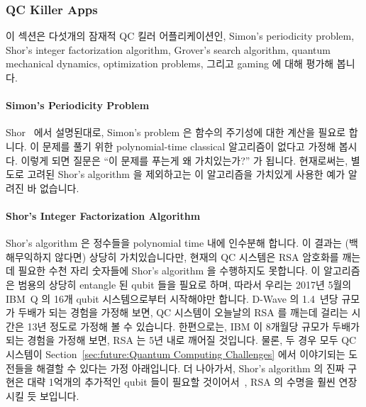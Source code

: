 \subsubsection{QC Killer Apps}
\label{sec:future:QC Killer Apps}

이 섹션은 다섯개의 잠재적 QC 킬러 어플리케이션인,
Simon's periodicity problem,
Shor's integer factorization algorithm,
Grover's search algorithm,
quantum mechanical dynamics,
optimization problems, 그리고
gaming 에 대해 평가해 봅니다.

\paragraph{Simon's Periodicity Problem}
\label{sec:future:Simon's Periodicity Problem}

Shor~\cite{PeterWSchor2001QuantumAlgorithms} 에서 설명된대로, Simon's problem
은 함수의 주기성에 대한 계산을 필요로 합니다.
이 문제를 풀기 위한 polynomial-time classical 알고리즘이 없다고 가정해 봅시다.
이렇게 되면 질문은 ``이 문제를 푸는게 왜 가치있는가?'' 가 됩니다.
현재로써는, 별도로 고려된 Shor's algorithm 을 제외하고는 이 알고리즘을 가치있게
사용한 예가 알려진 바 없습니다.

\paragraph{Shor's Integer Factorization Algorithm}
\label{sec:future:Shor's Integer Factorization Algorithm}

Shor's algorithm 은 정수들을 polynomial time 내에 인수분해 합니다.
이 결과는 (백해무익하지 않다면) 상당히 가치있습니다만, 현재의 QC 시스템은 RSA
암호화를 깨는데 필요한 수천 자리 숫자들에 Shor's algorithm 을 수행하지도
못합니다.
이 알고리즘은 범용의 상당히 entangle 된 qubit 들을 필요로 하며, 따라서 우리는
2017년 5월의 IBM~Q 의 16개 qubit 시스템으로부터 시작해야만 합니다.
D-Wave 의 1.4~년당 규모가 두배가 되는 경험을 가정해 보면, QC 시스템이 오늘날의
RSA 를 깨는데 걸리는 시간은 13년 정도로 가정해 볼 수 있습니다.
한편으로는, IBM 이 8개월당 규모가 두배가 되는 경험을 가정해 보면, RSA 는 5년
내로 깨어질 것입니다.
물론, 두 경우 모두 QC 시스템이
Section~\ref{sec:future:Quantum Computing Challenges} 에서 이야기되는 도전들을
해결할 수 있다는 가정 아래입니다.
더 나아가서, Shor's algorithm 의 진짜 구현은 대략 1억개의 추가적인 qubit 들이
필요할 것이어서~\cite{RachelCourtland2017GoogleQC}, RSA 의 수명을 훨씬 연장시킬
듯 보입니다.


